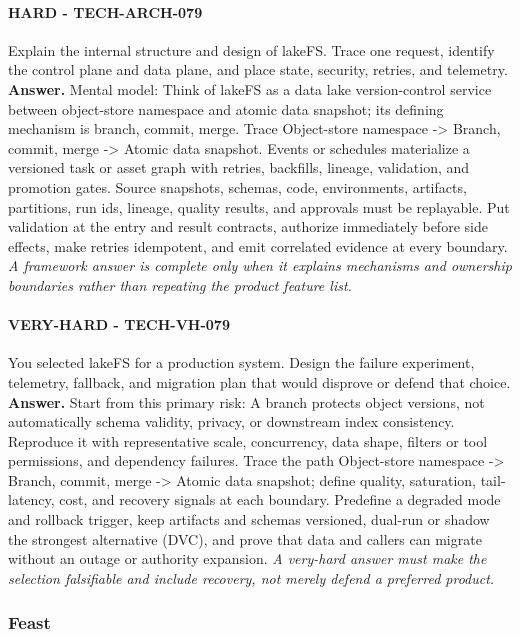 \paragraph{HARD - TECH-ARCH-079} Explain the internal structure and design of lakeFS. Trace one request, identify the control plane and data plane, and place state, security, retries, and telemetry.
\textbf{Answer.} Mental model: Think of lakeFS as a data lake version-control service between object-store namespace and atomic data snapshot; its defining mechanism is branch, commit, merge. Trace Object-store namespace -> Branch, commit, merge -> Atomic data snapshot. Events or schedules materialize a versioned task or asset graph with retries, backfills, lineage, validation, and promotion gates. Source snapshots, schemas, code, environments, artifacts, partitions, run ids, lineage, quality results, and approvals must be replayable. Put validation at the entry and result contracts, authorize immediately before side effects, make retries idempotent, and emit correlated evidence at every boundary.
\textit{A framework answer is complete only when it explains mechanisms and ownership boundaries rather than repeating the product feature list.}
\paragraph{VERY-HARD - TECH-VH-079} You selected lakeFS for a production system. Design the failure experiment, telemetry, fallback, and migration plan that would disprove or defend that choice.
\textbf{Answer.} Start from this primary risk: A branch protects object versions, not automatically schema validity, privacy, or downstream index consistency. Reproduce it with representative scale, concurrency, data shape, filters or tool permissions, and dependency failures. Trace the path Object-store namespace -> Branch, commit, merge -> Atomic data snapshot; define quality, saturation, tail-latency, cost, and recovery signals at each boundary. Predefine a degraded mode and rollback trigger, keep artifacts and schemas versioned, dual-run or shadow the strongest alternative (DVC), and prove that data and callers can migrate without an outage or authority expansion.
\textit{A very-hard answer must make the selection falsifiable and include recovery, not merely defend a preferred product.}
\subsubsection*{Feast}
